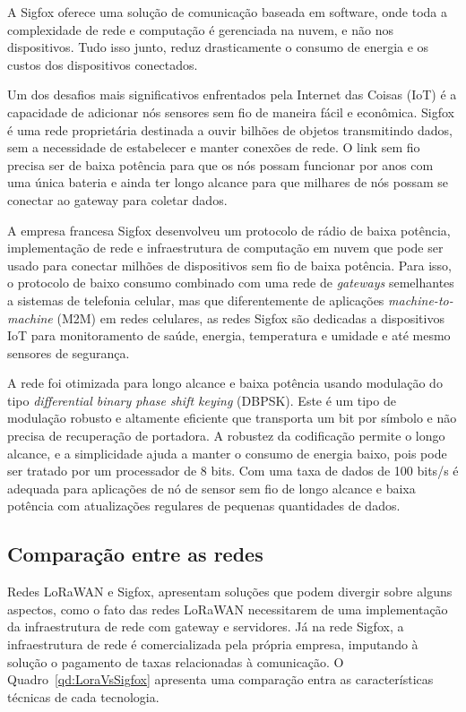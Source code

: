 A Sigfox oferece uma solução de comunicação baseada em software, onde toda a complexidade de rede e computação é gerenciada na nuvem, e não nos dispositivos. Tudo isso junto, reduz drasticamente o consumo de energia e os custos dos dispositivos conectados.


Um dos desafios mais significativos enfrentados pela Internet das Coisas (IoT) é a capacidade de adicionar nós sensores sem fio de maneira fácil e econômica. Sigfox é uma rede proprietária destinada a ouvir bilhões de objetos transmitindo dados, sem a necessidade de estabelecer e manter conexões de rede. O link sem fio precisa ser de baixa potência para que os nós possam funcionar por anos com uma única bateria e ainda ter longo alcance para que milhares de nós possam se conectar ao gateway para coletar dados.

A empresa francesa Sigfox desenvolveu um protocolo de rádio de baixa potência, implementação de rede e infraestrutura de computação em nuvem que pode ser usado para conectar milhões de dispositivos sem fio de baixa potência. Para isso, o protocolo de baixo consumo combinado com uma rede de \textit{gateways} semelhantes a sistemas de telefonia celular, mas que diferentemente de aplicações \textit{machine-to-machine} (M2M) em redes celulares, as redes Sigfox são dedicadas a dispositivos IoT para monitoramento de saúde, energia, temperatura e umidade e até mesmo sensores de segurança.

A rede foi otimizada para longo alcance e baixa potência usando modulação do tipo \textit{differential binary phase shift keying} (DBPSK). Este é um tipo de modulação robusto e altamente eficiente que transporta um bit por símbolo e não precisa de recuperação de portadora. A robustez da codificação permite o longo alcance, e a simplicidade ajuda a manter o consumo de energia baixo, pois pode ser tratado por um processador de 8 bits. Com uma taxa de dados de 100 bits/s é adequada para aplicações de nó de sensor sem fio de longo alcance e baixa potência com atualizações regulares de pequenas quantidades de dados.

\subsection{Comparação entre as redes}
Redes LoRaWAN e Sigfox, apresentam soluções que podem divergir sobre alguns aspectos, como o fato das redes LoRaWAN necessitarem de uma implementação da infraestrutura de rede com gateway e servidores. Já na rede Sigfox, a infraestrutura de rede é comercializada pela própria empresa, imputando à solução o pagamento de taxas relacionadas à comunicação. O Quadro~\ref{qd:LoraVsSigfox} apresenta uma comparação entra as características técnicas de cada tecnologia.

